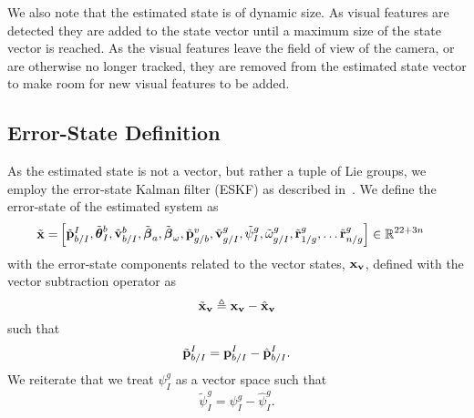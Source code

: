 We also note
that the estimated state is of dynamic size. As visual features are
detected they are added to the state vector until a maximum size of the state
vector is reached. As the visual features leave the field of view of the camera,
or are otherwise no longer tracked, they are removed from the estimated state
vector to make room for new visual features to be added.



\subsection{Error-State Definition}

As the estimated state is not a vector, but rather a tuple of Lie groups, we
employ the error-state Kalman filter (ESKF) as described in~\cite{koch2017relative}.
We define the error-state of the estimated system as
\begin{align}
  \tilde{\boldsymbol{\mathrm{x}}} =&
  \left[ \begin{matrix}
    \tilde{\boldsymbol{\mathrm{p}}}_{b/I}^{I}, \tilde{\boldsymbol{\mathrm{\theta}}}_I^{b}, \tilde{\boldsymbol{\mathrm{v}}}_{b/I}^b,
    \tilde{\boldsymbol{\mathrm{\beta}}}_a,
    \tilde{\boldsymbol{\mathrm{\beta}}}_{\omega},
    \tilde{\boldsymbol{\mathrm{p}}}_{g/b}^{v}, \tilde{\boldsymbol{\mathrm{v}}}_{g/I}^{g}, \tilde{\psi}_{I}^{g},
    \tilde{\omega}_{g/I}^{g},
      \tilde{\boldsymbol{\mathrm{r}}}_{1/g}^{g}, \dots \tilde{\boldsymbol{\mathrm{r}}}_{n/g}^{g}
  \end{matrix} \right]
  \in \mathbb{R}^{22 + 3n}
\end{align}
with the error-state components related to the vector states, $\boldsymbol{\mathrm{x}}_{\boldsymbol{\mathrm{v}}}$, defined with
the vector subtraction operator as
\begin{equation}
\tilde{\boldsymbol{\mathrm{x}}}_{\boldsymbol{\mathrm{v}}} \triangleq \boldsymbol{\mathrm{x}}_{\boldsymbol{\mathrm{v}}} - \hat{\boldsymbol{\mathrm{x}}}_{\boldsymbol{\mathrm{v}}}
\label{eq:est_paper_vector_error_state}
\end{equation}
such that
\begin{equation}
  \tilde{\boldsymbol{\mathrm{p}}}_{b/I}^I = \boldsymbol{\mathrm{p}}_{b/I}^I - \hat{\boldsymbol{\mathrm{p}}}_{b/I}^I.
  \label{eq:est_paper_uav_pos_err_state}
\end{equation}
We reiterate that we treat $\psi_I^g$ as a vector space such that
\begin{equation}
  \tilde{\psi}_I^g = \psi_I^g - \hat{\psi}_I^g.
  \label{eq:2d_att_err_state}
\end{equation}

